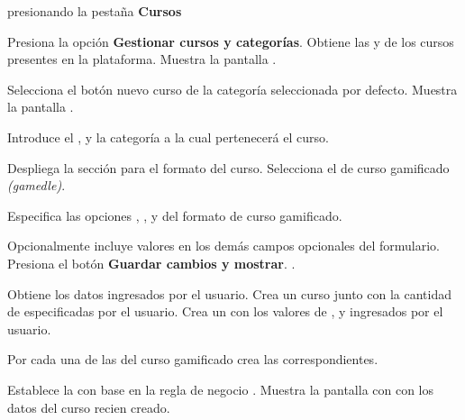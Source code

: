 \begin{UCtrayectoria}%
   presionando la pestaña {\bf Cursos}

  \Actor Presiona la opción {\bf Gestionar cursos y categorías}.
  \Sistema Obtiene las  y 
            de los cursos presentes en la plataforma.
  \Sistema Muestra la pantalla .

  \Actor Selecciona el botón nuevo curso de la categoría seleccionada por defecto.
  \Sistema Muestra la pantalla .

  \Actor Introduce el ,  y
         la categoría a la cual pertenecerá el curso.

  \Actor Despliega la sección para el formato del curso. 
  \Actor Selecciona el  de curso gamificado {\it(gamedle)}.
          \label{CU-E04-format}

  \Actor Especifica las opciones ,
         ,  y
          del formato de curso gamificado.
          

  \Actor Opcionalmente incluye valores en los demás campos opcionales del formulario.
  \Actor Presiona el botón {\bf Guardar cambios y mostrar}.  
          \label{CU-E04-submit}.

  \Sistema Obtiene los datos ingresados por el usuario.
  \Sistema Crea un curso  junto con la cantidad de
            especificadas por el usuario.
  \Sistema Crea un  con los valores de 
           ,  
           y  ingresados por el usuario.

  \Sistema Por cada una de las  del curso 
           gamificado crea las 
           correspondientes.

  \Sistema Establece la  con base en la regla de negocio
           .
  \Sistema Muestra la pantalla con  con los datos del curso recien
           creado.

\end{UCtrayectoria}

